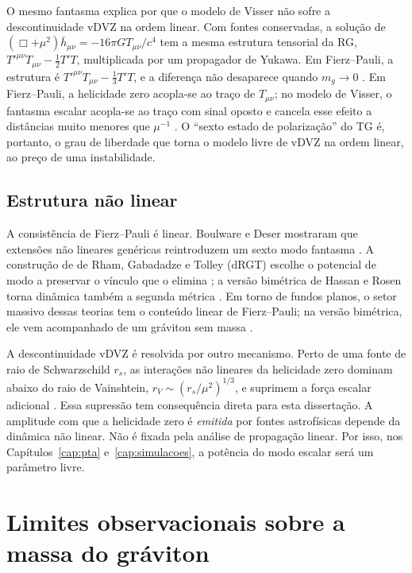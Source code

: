 O mesmo fantasma explica por que o modelo de Visser não sofre a
descontinuidade vDVZ na ordem linear. Com fontes conservadas, a solução
de $(\Box+\mu^2)\bar h_{\mu\nu}=-16\pi GT_{\mu\nu}/c^4$ tem a mesma
estrutura tensorial da RG, $T'^{\mu\nu}T_{\mu\nu}-\frac12T'T$,
multiplicada por um propagador de Yukawa. Em Fierz--Pauli, a estrutura
é $T'^{\mu\nu}T_{\mu\nu}-\frac13T'T$, e a diferença não desaparece
quando $m_g\to0$ \autocite{vandam1970,zakharov1970}. Em Fierz--Pauli, a
helicidade zero acopla-se ao traço de $T_{\mu\nu}$; no modelo de Visser,
o fantasma escalar acopla-se ao traço com sinal oposto e cancela esse
efeito a distâncias muito menores que $\mu^{-1}$ \autocite{park2010}.
O ``sexto estado de polarização'' do TG é, portanto, o grau de
liberdade que torna o modelo livre de vDVZ na ordem linear, ao preço de
uma instabilidade.

\subsection{Estrutura não linear}
\label{sec:fund-naolinear}

A consistência de Fierz--Pauli é linear. Boulware e Deser mostraram que
extensões não lineares genéricas reintroduzem um sexto modo fantasma
\autocite{boulware1972}. A construção de de Rham, Gabadadze e Tolley
(dRGT) escolhe o potencial de modo a preservar o vínculo que o elimina
\autocite{derham2011}; a versão bimétrica de Hassan e Rosen torna
dinâmica também a segunda métrica \autocite{hassan2012}. Em torno de
fundos planos, o setor massivo dessas teorias tem o conteúdo linear de
Fierz--Pauli; na versão bimétrica, ele vem acompanhado de um gráviton
sem massa \autocite{derham2014review}.

A descontinuidade vDVZ é resolvida por outro mecanismo. Perto de uma
fonte de raio de Schwarzschild $r_s$, as interações não lineares da
helicidade zero dominam abaixo do raio de Vainshtein,
$r_V\sim(r_s/\mu^2)^{1/3}$, e suprimem a força escalar adicional
\autocite{vainshtein1972,babichev2013}. Essa supressão tem consequência
direta para esta dissertação. A amplitude com que a helicidade zero é
\emph{emitida} por fontes astrofísicas depende da dinâmica não linear.
Não é fixada pela análise de propagação linear. Por isso, nos
Capítulos~\ref{cap:pta} e~\ref{cap:simulacoes}, a potência do modo
escalar será um parâmetro livre.

\section{Limites observacionais sobre a massa do gráviton}

